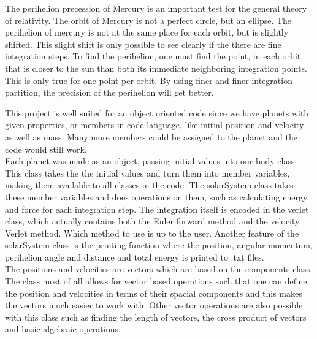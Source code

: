 \documentclass[10pt,a4paper]{article}
\begin{document}
The perihelion precession of Mercury is an important test for the general theory of relativity. The orbit of Mercury is not a perfect circle, but an ellipse. The perihelion of mercury is not at the same place for each orbit, but is slightly shifted. This slight shift is only possible to see clearly if the there are fine integration steps. To find the perihelion, one must find the point, in each orbit, that is closer to the sun than both its immediate neighboring integration points. This is only true for one point per orbit. By using finer and finer integration partition, the precision of the perihelion will get better.   

\noindent This project is well suited for an object oriented code since we have planets with given properties, or members in code language, like initial position and velocity as well as mass. Many more members could be assigned to the planet and the code would still work. 
\\
Each planet was made as an object, passing initial values into our body class. This class takes the the initial values and turn them into member variables, making them available to all classes in the code. The solarSystem class takes these member variables and does operations on them, such as calculating energy and force for each integration step. The integration itself is encoded in the verlet class, which actually contains both the Euler forward method and the velocity Verlet method. Which method to use is up to the user. Another feature of the solarSystem class is the printing function where the position, angular momentum, perihelion angle and distance and total energy is printed to .txt files.
\\
The positions and velocities are vectors which are based on the components class. The class most of all allows for vector based operations such that one can define the position and velocities in terms of their spacial components and this makes the vectors much easier to work with. Other vector operations are also possible with this class such as finding the length of vectors, the cross product of vectors and basic algebraic operations.
\end{document}
